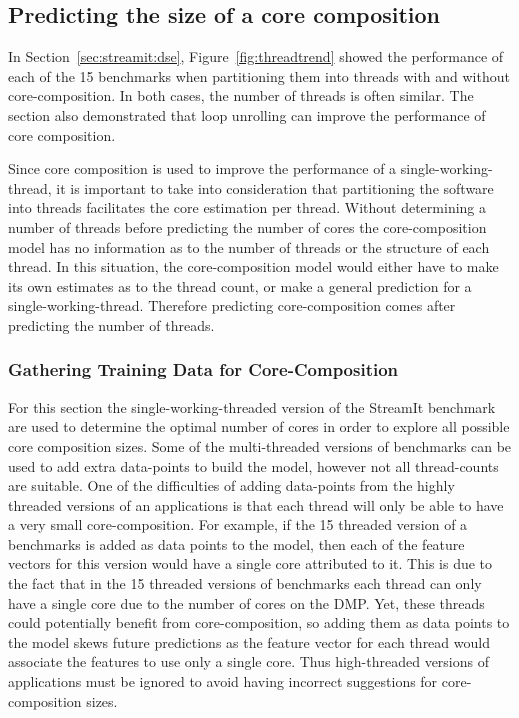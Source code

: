 \subsection{Predicting the size of a core composition}
In Section~\ref{sec:streamit:dse}, Figure~\ref{fig:threadtrend} showed the performance of each of the 15 benchmarks when partitioning them into threads with and without core-composition.
In both cases, the number of threads is often similar.
The section also demonstrated that loop unrolling can improve the performance of core composition.

Since core composition is used to improve the performance of a single-working-thread, it is important to take into consideration that partitioning the software into threads facilitates the core estimation per thread.
Without determining a number of threads before predicting the number of cores the core-composition model has no information as to the number of threads or the structure of each thread.
In this situation, the core-composition model would either have to make its own estimates as to the thread count, or make a general prediction for a single-working-thread.
Therefore predicting core-composition comes after predicting the number of threads.

\subsubsection{Gathering Training Data for Core-Composition}
For this section the single-working-threaded version of the StreamIt benchmark are used to determine the optimal number of cores in order to explore all possible core composition sizes.
Some of the multi-threaded versions of benchmarks can be used to add extra data-points to build the model, however not all thread-counts are suitable.
One of the difficulties of adding data-points from the highly threaded versions of an applications is that each thread will only be able to have a very small core-composition.
For example, if the 15 threaded version of a benchmarks is added as data points to the model, then each of the feature vectors for this version would have a single core attributed to it.
This is due to the fact that in the 15 threaded versions of benchmarks each thread can only have a single core due to the number of cores on the DMP.
Yet, these threads could potentially benefit from core-composition, so adding them as data points to the model skews future predictions as the feature vector for each thread would associate the features to use only a single core.
Thus high-threaded versions of applications must be ignored to avoid having incorrect suggestions for core-composition sizes.

